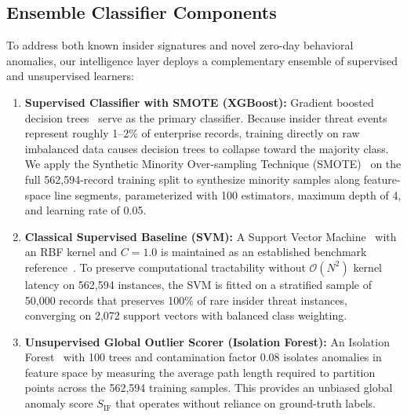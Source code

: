 \documentclass[conference]{IEEEtran}
\begin{document}
\subsection{Ensemble Classifier Components}
To address both known insider signatures and novel zero-day behavioral anomalies, our intelligence layer deploys a complementary ensemble of supervised and unsupervised learners:
\begin{enumerate}
    \item \textbf{Supervised Classifier with SMOTE (XGBoost):} Gradient boosted decision trees~\cite{chen2016xgboost} serve as the primary classifier. Because insider threat events represent roughly 1--2\% of enterprise records, training directly on raw imbalanced data causes decision trees to collapse toward the majority class. We apply the Synthetic Minority Over-sampling Technique (SMOTE)~\cite{chawla2002smote} on the full 562,594-record training split to synthesize minority samples along feature-space line segments, parameterized with 100 estimators, maximum depth of 4, and learning rate of 0.05.
    \item \textbf{Classical Supervised Baseline (SVM):} A Support Vector Machine~\cite{cortes1995support} with an RBF kernel and $C = 1.0$ is maintained as an established benchmark reference~\cite{alzaabi2024review}. To preserve computational tractability without $\mathcal{O}(N^2)$ kernel latency on 562,594 instances, the SVM is fitted on a stratified sample of 50,000 records that preserves 100\% of rare insider threat instances, converging on 2,072 support vectors with balanced class weighting.
    \item \textbf{Unsupervised Global Outlier Scorer (Isolation Forest):} An Isolation Forest~\cite{liu2008isolation} with 100 trees and contamination factor 0.08 isolates anomalies in feature space by measuring the average path length required to partition points across the 562,594 training samples. This provides an unbiased global anomaly score $S_{\text{IF}}$ that operates without reliance on ground-truth labels.
\end{enumerate}
\end{document}
